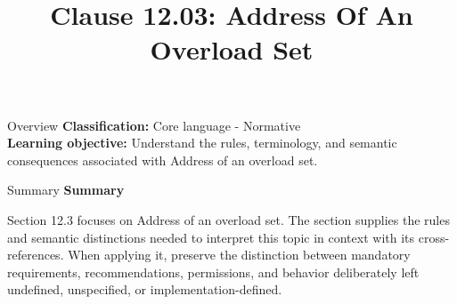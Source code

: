 \documentclass[10pt,letterpaper]{article}
\title{Clause 12.03: Address Of An Overload Set}
\author{}
\date{}
\begin{document}
\maketitle
\begin{CornellOverviewBox}{Overview}
\textbf{Classification:} Core language - Normative\\[2pt]
\textbf{Learning objective:} Understand the rules, terminology, and semantic consequences associated with Address of an overload set.
\end{CornellOverviewBox}\begin{CornellSummaryBox}{Summary}
{\sffamily\bfseries\color{Accent} Summary}\par\vspace{3pt}Section 12.3 focuses on Address of an overload set. The section supplies the rules and semantic distinctions needed to interpret this topic in context with its cross-references. When applying it, preserve the distinction between mandatory requirements, recommendations, permissions, and behavior deliberately left undefined, unspecified, or implementation-defined.
\end{CornellSummaryBox}
\end{document}
